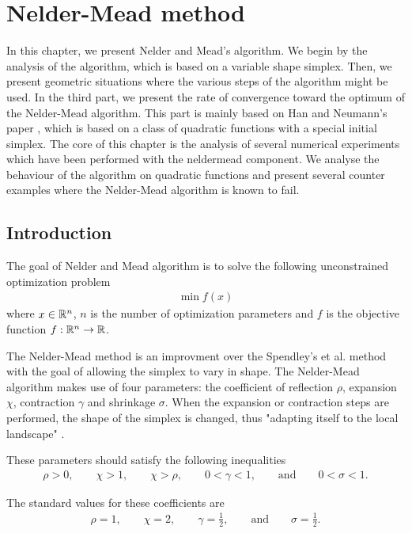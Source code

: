 \chapter{Nelder-Mead method}

In this chapter, we present Nelder and Mead's \cite{citeulike:3009487} algorithm.
We begin by the analysis of the algorithm, which is based on a variable shape simplex.
Then, we present geometric situations where the various steps of the algorithm 
might be used. In the third part, we present the rate of convergence toward the optimum of 
the Nelder-Mead algorithm. This part is mainly based on Han and Neumann's paper \cite{HanNeumann2006}, 
which is based on a class of quadratic functions with a special initial 
simplex. The core of this chapter is the analysis of several numerical 
experiments which have been performed with the neldermead component.
We analyse the behaviour of the algorithm on quadratic functions and 
present several counter examples where the Nelder-Mead algorithm is 
known to fail.

\section{Introduction}

The goal of Nelder and Mead algorithm is to solve the 
following unconstrained optimization problem
\begin{eqnarray}
\min f(x)
\end{eqnarray}
where $x\in \mathbb{R}^n$, $n$ is the number of optimization parameters and $f$ is the objective 
function $f:\mathbb{R}^n\rightarrow \mathbb{R}$.

The Nelder-Mead method is an improvment over the Spendley's et al.
method with the goal of allowing the simplex to vary in shape.
The Nelder-Mead algorithm makes use of four parameters: the 
coefficient of reflection $\rho$, expansion $\chi$, 
contraction $\gamma$ and shrinkage $\sigma$.
When the expansion or contraction steps are performed, the shape 
of the simplex is changed, thus "adapting itself to the 
local landscape" \cite{citeulike:3009487}.

These parameters should satisfy the following inequalities \cite{citeulike:3009487,lagarias:112}
\begin{eqnarray}
\label{condition-coeffs}
\rho>0, \qquad \chi > 1, \qquad \chi > \rho, \qquad 0<\gamma<1, \qquad \textrm{and} \qquad 0<\sigma<1.
\end{eqnarray}

The standard values for these coefficients are 
\begin{eqnarray}
\label{standard-coeffs}
\rho=1, \qquad \chi =2, \qquad \gamma=\frac{1}{2}, \qquad \textrm{and} \qquad \sigma=\frac{1}{2}.
\end{eqnarray}

